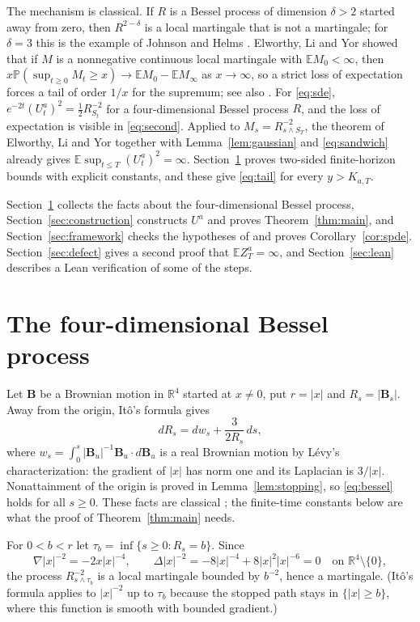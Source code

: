 \documentclass[11pt]{amsart}
\theoremstyle{remark}
\newcommand{\E}{\mathbb E}
\newcommand{\Pp}{\mathbb P}
\newcommand{\R}{\mathbb R}
\begin{document}
The mechanism is classical. If $R$ is a Bessel process of dimension $\delta>2$ started away from zero, then $R^{2-\delta}$ is a local martingale that is not a martingale; for $\delta=3$ this is the example of Johnson and Helms \cite{JH63}. Elworthy, Li and Yor \cite{ELY97} showed that if $M$ is a nonnegative continuous local martingale with $\E M_0<\infty$, then $x\Pp(\sup_{t\ge0}M_t\ge x)\to\E M_0-\E M_\infty$ as $x\to\infty$, so a strict loss of expectation forces a tail of order $1/x$ for the supremum; see also \cite{ELY99}. For \eqref{eq:sde}, $e^{-2t}(U_t^a)^2=\frac12R_{S_t}^{-2}$ for a four-dimensional Bessel process $R$, and the loss of expectation is visible in \eqref{eq:second}. Applied to $M_s=R^{-2}_{s\wedge S_T}$, the theorem of Elworthy, Li and Yor together with Lemma~\ref{lem:gaussian} and \eqref{eq:sandwich} already gives $\E\sup_{t\le T}(U_t^a)^2=\infty$. Section~\ref{sec:bessel} proves two-sided finite-horizon bounds with explicit constants, and these give \eqref{eq:tail} for every $y>K_{a,T}$.

Section~\ref{sec:bessel} collects the facts about the four-dimensional Bessel process, Section~\ref{sec:construction} constructs $U^a$ and proves Theorem~\ref{thm:main}, and Section~\ref{sec:framework} checks the hypotheses of \cite[Theorem~6.4]{AV25} and proves Corollary~\ref{cor:spde}. Section~\ref{sec:defect} gives a second proof that $\E Z_T^a=\infty$, and Section~\ref{sec:lean} describes a Lean verification of some of the steps.

\section{The four-dimensional Bessel process}\label{sec:bessel}

Let $\mathbf B$ be a Brownian motion in $\R^4$ started at $x\ne0$, put $r=|x|$ and $R_s=|\mathbf B_s|$. Away from the origin, It\^o's formula gives
\begin{equation}\label{eq:bessel}
 dR_s=dw_s+\frac{3}{2R_s}\,ds,
\end{equation}
where $w_s=\int_0^s|\mathbf B_u|^{-1}\mathbf B_u\cdot d\mathbf B_u$ is a real Brownian motion by L\'evy's characterization: the gradient of $|x|$ has norm one and its Laplacian is $3/|x|$. Nonattainment of the origin is proved in Lemma~\ref{lem:stopping}, so \eqref{eq:bessel} holds for all $s\ge0$. These facts are classical \cite[Chapter~XI]{RY99}; the finite-time constants below are what the proof of Theorem~\ref{thm:main} needs.

For $0<b<r$ let $\tau_b=\inf\{s\ge0:R_s=b\}$. Since
\[
 \nabla|x|^{-2}=-2x|x|^{-4},\qquad \Delta|x|^{-2}=-8|x|^{-4}+8|x|^2|x|^{-6}=0\quad\text{on }\R^4\setminus\{0\},
\]
the process $R_{s\wedge\tau_b}^{-2}$ is a local martingale bounded by $b^{-2}$, hence a martingale. (It\^o's formula applies to $|x|^{-2}$ up to $\tau_b$ because the stopped path stays in $\{|x|\ge b\}$, where this function is smooth with bounded gradient.)
\end{document}

